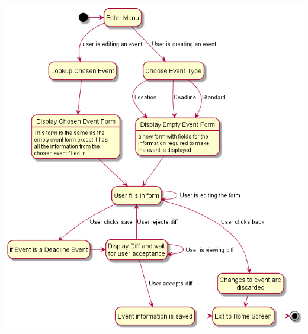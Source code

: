 \documentclass{scrreprt}
\begin{document}
\begin{center}
\includegraphics[scale=0.5]{edit.png}
\end{center}
\end{document}
